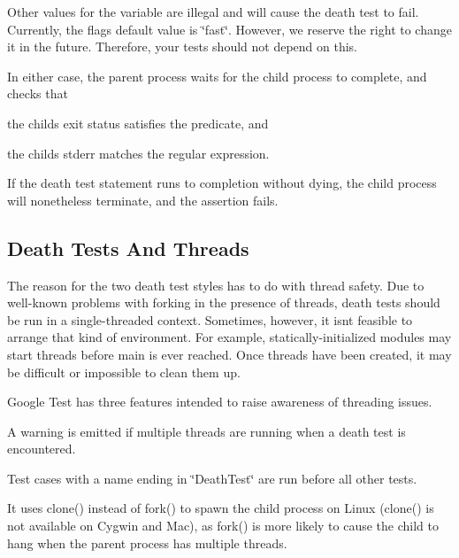 Other values for the variable are illegal and will cause the death test to fail. Currently, the flag\textquotesingle{}s default value is {\ttfamily \char`\"{}fast\char`\"{}}. However, we reserve the right to change it in the future. Therefore, your tests should not depend on this.

In either case, the parent process waits for the child process to complete, and checks that


\begin{DoxyEnumerate}
\item the child\textquotesingle{}s exit status satisfies the predicate, and
\end{DoxyEnumerate}
\begin{DoxyEnumerate}
\item the child\textquotesingle{}s stderr matches the regular expression.
\end{DoxyEnumerate}

If the death test statement runs to completion without dying, the child process will nonetheless terminate, and the assertion fails.

\subsection*{Death Tests And Threads}

The reason for the two death test styles has to do with thread safety. Due to well-\/known problems with forking in the presence of threads, death tests should be run in a single-\/threaded context. Sometimes, however, it isn\textquotesingle{}t feasible to arrange that kind of environment. For example, statically-\/initialized modules may start threads before main is ever reached. Once threads have been created, it may be difficult or impossible to clean them up.

Google Test has three features intended to raise awareness of threading issues.


\begin{DoxyEnumerate}
\item A warning is emitted if multiple threads are running when a death test is encountered.
\end{DoxyEnumerate}
\begin{DoxyEnumerate}
\item Test cases with a name ending in \char`\"{}\+Death\+Test\char`\"{} are run before all other tests.
\end{DoxyEnumerate}
\begin{DoxyEnumerate}
\item It uses {\ttfamily clone()} instead of {\ttfamily fork()} to spawn the child process on Linux ({\ttfamily clone()} is not available on Cygwin and Mac), as {\ttfamily fork()} is more likely to cause the child to hang when the parent process has multiple threads.
\end{DoxyEnumerate}


